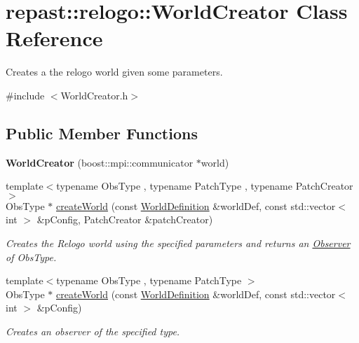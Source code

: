 \hypertarget{classrepast_1_1relogo_1_1_world_creator}{\section{repast\-:\-:relogo\-:\-:World\-Creator Class Reference}
\label{classrepast_1_1relogo_1_1_world_creator}
}


Creates a the relogo world given some parameters.  




{\ttfamily \#include $<$World\-Creator.\-h$>$}

\subsection*{Public Member Functions}
\begin{DoxyCompactItemize}
\item 
\hypertarget{classrepast_1_1relogo_1_1_world_creator_ad664f192bb1909995b5df1b195487266}{{\bfseries World\-Creator} (boost\-::mpi\-::communicator $\ast$world)}\label{classrepast_1_1relogo_1_1_world_creator_ad664f192bb1909995b5df1b195487266}

\item 
{\footnotesize template$<$typename Obs\-Type , typename Patch\-Type , typename Patch\-Creator $>$ }\\Obs\-Type $\ast$ \hyperlink{classrepast_1_1relogo_1_1_world_creator_a61ef4601065168dfc0fc7fbf4d47e181}{create\-World} (const \hyperlink{classrepast_1_1relogo_1_1_world_definition}{World\-Definition} \&world\-Def, const std\-::vector$<$ int $>$ \&p\-Config, Patch\-Creator \&patch\-Creator)
\begin{DoxyCompactList}\small\item\em Creates the Relogo world using the specified parameters and returns an \hyperlink{classrepast_1_1relogo_1_1_observer}{Observer} of Obs\-Type. \end{DoxyCompactList}\item 
{\footnotesize template$<$typename Obs\-Type , typename Patch\-Type $>$ }\\Obs\-Type $\ast$ \hyperlink{classrepast_1_1relogo_1_1_world_creator_aaceddc663139a0fda80b3022e0cd0d08}{create\-World} (const \hyperlink{classrepast_1_1relogo_1_1_world_definition}{World\-Definition} \&world\-Def, const std\-::vector$<$ int $>$ \&p\-Config)
\begin{DoxyCompactList}\small\item\em Creates an observer of the specified type. \end{DoxyCompactList}\end{DoxyCompactItemize}



